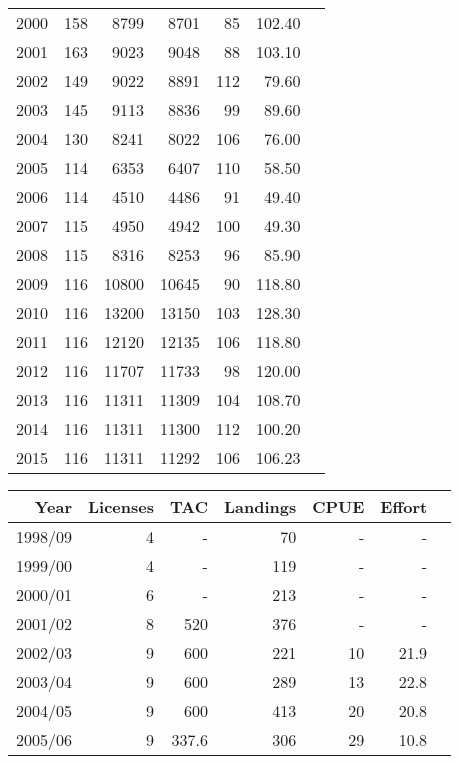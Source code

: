 \documentclass[paper=a4, fontsize=11pt]{article}
\begin{document}
\begin{table}[h]
\begin{tabular}{rrrrrrr}
2000 & 158 & 8799 & 8701 &  85 & 102.40 \\ 
2001 & 163 & 9023 & 9048 &  88 & 103.10 \\ 
2002 & 149 & 9022 & 8891 & 112 & 79.60 \\ 
2003 & 145 & 9113 & 8836 &  99 & 89.60 \\ 
2004 & 130 & 8241 & 8022 & 106 & 76.00 \\ 
2005 & 114 & 6353 & 6407 & 110 & 58.50 \\ 
2006 & 114 & 4510 & 4486 &  91 & 49.40 \\ 
2007 & 115 & 4950 & 4942 & 100 & 49.30 \\ 
2008 & 115 & 8316 & 8253 &  96 & 85.90 \\ 
2009 & 116 & 10800 & 10645 &  90 & 118.80 \\ 
2010 & 116 & 13200 & 13150 & 103 & 128.30 \\ 
2011 & 116 & 12120 & 12135 & 106 & 118.80 \\ 
2012 & 116 & 11707 & 11733 &  98 & 120.00 \\ 
2013 & 116 & 11311 & 11309 & 104 & 108.70 \\ 
2014 & 116 & 11311 & 11300 & 112 & 100.20 \\ 
2015 & 116 & 11311 & 11292 & 106 & 106.23 \\ 
   \hline
\end{tabular}
\newline
\vspace*{0.5cm}
\begin{center}
 \begin{tabular}{rrrrrrr}
  \hline
Year & Licenses & TAC & Landings & CPUE & Effort \\ 
  \hline
1998/09 &   4 & - &  70 & - & - \\ 
1999/00 &   4 & - & 119 & - & - \\ 
2000/01 &   6 & - & 213 & - & - \\ 
2001/02 &   8 & 520 & 376 & - & - \\ 
2002/03 &   9 & 600 & 221 & 10 & 21.9 \\ 
2003/04 &   9 & 600 & 289 & 13 & 22.8 \\ 
2004/05 &   9 & 600 & 413 & 20 & 20.8 \\ 
2005/06 &   9 & 337.6 & 306 & 29 & 10.8 \\ 

\end{tabular}
\end{center}
\end{table}
\end{document}
